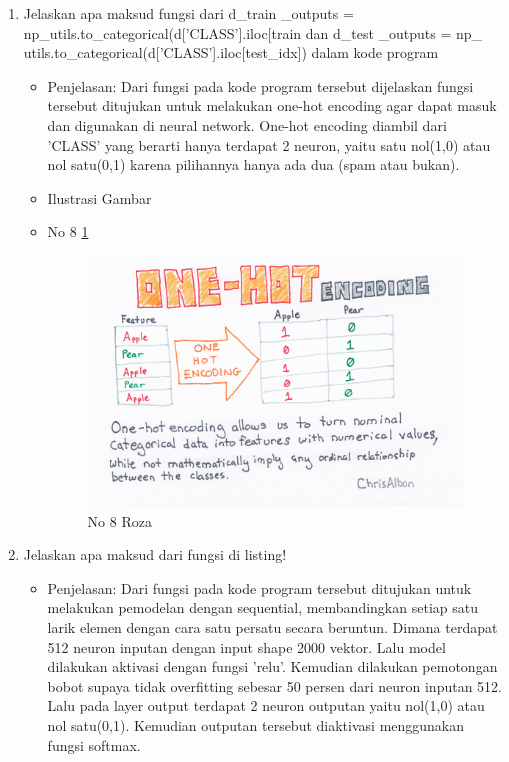 \begin{enumerate}
\item Jelaskan apa maksud fungsi dari d\_train \_outputs = np\_utils.to\_categorical(d['CLASS'].iloc[train dan d\_test \_outputs = np\_ utils.to\_categorical(d['CLASS'].iloc[test\_idx]) dalam kode program
\begin{itemize}
\item Penjelasan: Dari fungsi pada kode program tersebut dijelaskan fungsi tersebut ditujukan untuk melakukan one-hot encoding agar dapat masuk dan digunakan di neural network. One-hot encoding diambil dari 'CLASS' yang berarti hanya terdapat 2 neuron, yaitu satu nol(1,0) atau nol satu(0,1) karena pilihannya hanya ada dua (spam atau bukan).
\par 
\par
\item Ilustrasi Gambar
\item No 8 \ref{teori8}
\begin{figure}[!hbtp]
\centering
\includegraphics[scale=0.4]{figures/teori8.png}
\caption{No 8 Roza}
\label{teori8}
\end{figure}
\par
\end{itemize}
\par
\par

\item Jelaskan apa maksud dari fungsi di listing!

\begin{itemize}
\item Penjelasan: Dari fungsi pada kode program tersebut ditujukan untuk melakukan pemodelan dengan sequential, membandingkan setiap satu larik elemen dengan cara satu persatu secara beruntun. Dimana terdapat 512 neuron inputan dengan input shape 2000 vektor. Lalu model dilakukan aktivasi dengan fungsi 'relu'. Kemudian dilakukan pemotongan bobot supaya tidak overfitting sebesar 50 persen dari neuron inputan 512. Lalu pada layer output terdapat 2 neuron outputan yaitu nol(1,0) atau nol satu(0,1). Kemudian outputan tersebut diaktivasi menggunakan fungsi softmax.
\par 
\end{itemize}
\par
\par


\end{enumerate}
